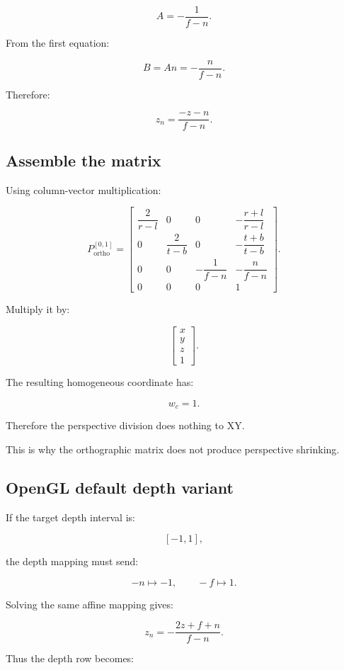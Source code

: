 \[
 \boxed{ A=-\frac1{f-n} }.
\]

From the first equation:

\[
 B=An=-\frac n{f-n}.
\]

Therefore:

\[
 \boxed{ z_n=\frac{-z-n}{f-n} }.
\]

\subsection{Assemble the matrix}\label{02-foundations-ii-ch033-assemble-the-matrix}

Using column-vector multiplication:

\[
 \boxed{ P_{\mathrm{ortho}}^{[0,1]}= \begin{bmatrix} \dfrac2{r-l}&0&0&-\dfrac{r+l}{r-l}\\ 0&\dfrac2{t-b}&0&-\dfrac{t+b}{t-b}\\ 0&0&-\dfrac1{f-n}&-\dfrac n{f-n}\\ 0&0&0&1 \end{bmatrix} }.
\]

Multiply it by:

\[
 \begin{bmatrix}x\\y\\z\\1\end{bmatrix}.
\]

The resulting homogeneous coordinate has:

\[
 w_c=1.
\]

Therefore the perspective division does nothing to XY.

This is why the orthographic matrix does not produce perspective shrinking.

\subsection{OpenGL default depth variant}\label{02-foundations-ii-ch033-opengl-default-depth-variant}

If the target depth interval is:

\[
 [-1,1],
\]

the depth mapping must send:

\[
 -n\mapsto-1, \qquad -f\mapsto1.
\]

Solving the same affine mapping gives:

\[
 \boxed{ z_n= -\frac{2z+f+n}{f-n} }.
\]

Thus the depth row becomes:

